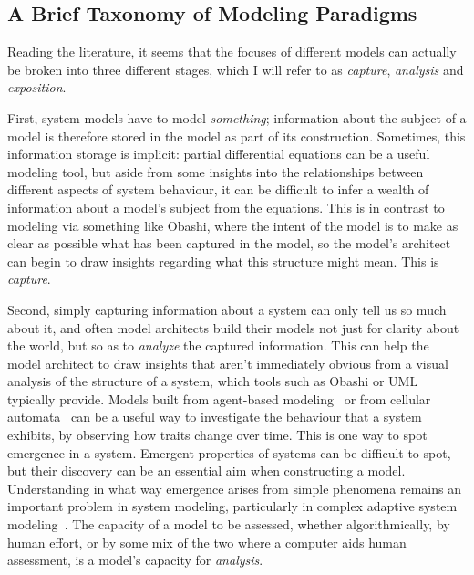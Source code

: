 \documentclass[draft,12pt]{article}
\begin{document}
\subsection{A Brief Taxonomy of Modeling Paradigms}
Reading the literature, it seems that the focuses of different models can
actually be broken into three different stages, which I will refer to as
\emph{capture}, \emph{analysis} and \emph{exposition}.\par

First, system models have to model \emph{something}; information about the
subject of a model is therefore stored in the model as part of its construction.
Sometimes, this information storage is implicit: partial differential equations
can be a useful modeling tool, but aside from some insights into the
relationships between different aspects of system behaviour, it can be difficult
to infer a wealth of information about a model's subject from the equations.
This is in contrast to modeling via something like Obashi, where the intent of the
model is to make as clear as possible what has been captured in the model, so
the model's architect can begin to draw insights regarding what this structure
might mean.
This is \emph{capture}.\par

Second, simply capturing information about a system can only tell us so much
about it, and often model architects build their models not just for clarity
about the world, but so as to \emph{analyze} the captured information. This can
help the model architect to draw insights that aren't immediately obvious from a
visual analysis of the structure of a system, which tools such as Obashi or UML
typically provide. Models built from agent-based
modeling~\citep{tisue2004netlogo} or from cellular
automata~\citep{wolfram1984cellular} can be a useful way to investigate the
behaviour that a system exhibits, by observing how traits change over time. This
is one way to spot emergence in a system\citep{miller2006modeling}. Emergent
properties of systems can be difficult to spot, but their discovery can be an
essential aim when constructing a model. Understanding in what way emergence
arises from simple phenomena remains an important problem in system modeling,
particularly in complex adaptive system modeling~\citep{gell1994complex}.
The capacity of a model to be assessed, whether algorithmically, by human
effort, or by some mix of the two where a computer aids human assessment, is a
model's capacity for \emph{analysis}.\par
\end{document}
